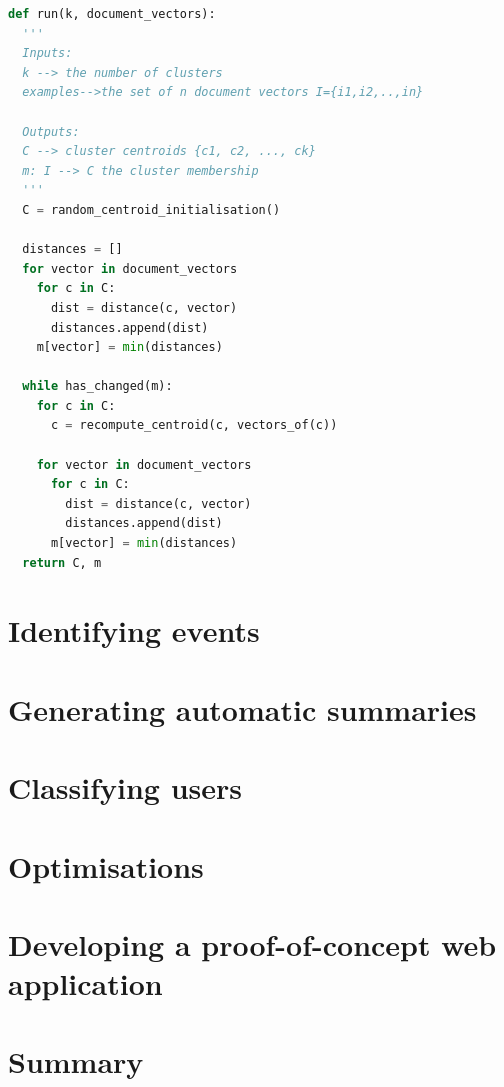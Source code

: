 \begin{lstlisting}[language=Python, label=KmeansClustererSnippet, caption=Pseudocode for k-Means algorithm]
def run(k, document_vectors):
  '''
  Inputs: 
  k --> the number of clusters
  examples-->the set of n document vectors I={i1,i2,..,in}
  
  Outputs:
  C --> cluster centroids {c1, c2, ..., ck}
  m: I --> C the cluster membership
  '''
  C = random_centroid_initialisation()
  
  distances = []
  for vector in document_vectors
    for c in C:
      dist = distance(c, vector)
      distances.append(dist)
    m[vector] = min(distances)

  while has_changed(m):
    for c in C:
      c = recompute_centroid(c, vectors_of(c))   
    
    for vector in document_vectors
      for c in C:
        dist = distance(c, vector)  
        distances.append(dist)
      m[vector] = min(distances)
  return C, m

\end{lstlisting}

\section{Identifying events}

\section{Generating automatic summaries}

\section{Classifying users}

\section{Optimisations}

\section{Developing a proof-of-concept web application}\label{WebApp}

\section{Summary}



